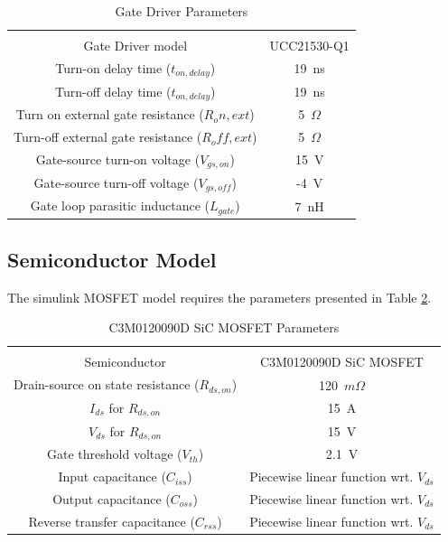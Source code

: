 \documentclass[12pt]{article} %
\begin{document}
\begin{table}[h]
\centering
\caption{Gate Driver Parameters}
\label{tab:gatedriverparameters}
\begin{tabular}{cc}
\hline \\
Gate Driver model      &   UCC21530-Q1   \\
Turn-on delay time ($t_{on,delay}$)      &   19~ns   \\
Turn-off delay time ($t_{on,delay}$)    &   19~ns    \\
Turn on external gate resistance ($R_on,ext$)    &   5~$\Omega$    \\
Turn-off external gate resistance  ($R_off,ext$)     &   5~$\Omega$   \\
Gate-source turn-on voltage ($V_{gs,on}$) & 15~V\\
Gate-source turn-off voltage ($V_{gs,off}$) & -4~V\\
Gate loop parasitic inductance ($L_{gate}$) & 7~nH\\
\hline
\end{tabular}
\end{table}

\subsection{Semiconductor Model}
The simulink MOSFET model requires the parameters presented in Table \ref{tab:semiconductorparameters}.
\begin{table}[h]
\centering
\caption{C3M0120090D SiC MOSFET Parameters}
\label{tab:semiconductorparameters}
\begin{tabular}{cc}
\hline \\
Semiconductor      &   C3M0120090D SiC MOSFET   \\
Drain-source on state resistance ($R_{ds,on}$)      &   120~$m\Omega$    \\
$I_{ds}$ for $R_{ds,on}$    &   15~A    \\
$V_{ds}$ for $R_{ds,on}$   &   15~V    \\
Gate threshold voltage ($V_{th}$)   &   2.1~V   \\
Input capacitance ($C_{iss}$) & Piecewise linear function wrt. $V_{ds}$\\
Output capacitance ($C_{oss}$) & Piecewise linear function wrt. $V_{ds}$\\
Reverse transfer capacitance ($C_{rss}$) &Piecewise linear function wrt. $V_{ds}$ \\
\hline
\end{tabular}
\end{table}
\end{document}

